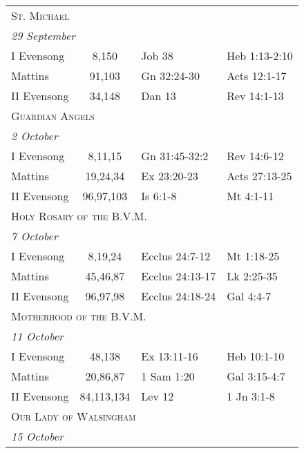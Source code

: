 \begin{longtable}{l c l l}
\multicolumn{4}{l}{\textsc{St. Michael}}\\
\multicolumn{4}{l}{\textit{29 September}}\\
\hspace{1em} I Evensong&8,150&Job 38&Heb 1:13-2:10\\
\hspace{1em} Mattins&91,103&Gn 32:24-30&Acts 12:1-17\\
\hspace{1em} II Evensong&34,148&Dan 13&Rev 14:1-13\\
%
\multicolumn{4}{l}{\textsc{Guardian Angels}}\\
\multicolumn{4}{l}{\textit{2 October}}\\
\hspace{1em} I Evensong&8,11,15&Gn 31:45-32:2&Rev 14:6-12\\
\hspace{1em} Mattins&19,24,34&Ex 23:20-23&Acts 27:13-25\\
\hspace{1em} II Evensong&96,97,103&Is 6:1-8&Mt 4:1-11\\
%
\multicolumn{4}{l}{\textsc{Holy Rosary of the B.V.M.}}\\
\multicolumn{4}{l}{\textit{7 October}}\\
\hspace{1em} I Evensong&8,19,24&Ecclus 24:7-12&Mt 1:18-25\\
\hspace{1em} Mattins&45,46,87&Ecclus 24:13-17&Lk 2:25-35\\
\hspace{1em} II Evensong&96,97,98&Ecclus 24:18-24&Gal 4:4-7\\
%
\multicolumn{4}{l}{\textsc{Motherhood of the B.V.M.}}\\
\multicolumn{4}{l}{\textit{11 October}}\\
\hspace{1em} I Evensong&48,138&Ex 13:11-16&Heb 10:1-10\\
\hspace{1em} Mattins&20,86,87&1 Sam 1:20&Gal 3:15-4:7\\
\hspace{1em} II Evensong&84,113,134&Lev 12&1 Jn 3:1-8\\
%
\multicolumn{4}{l}{\textsc{Our Lady of Walsingham}}\\
\multicolumn{4}{l}{\textit{15 October}}\\

\end{longtable}
